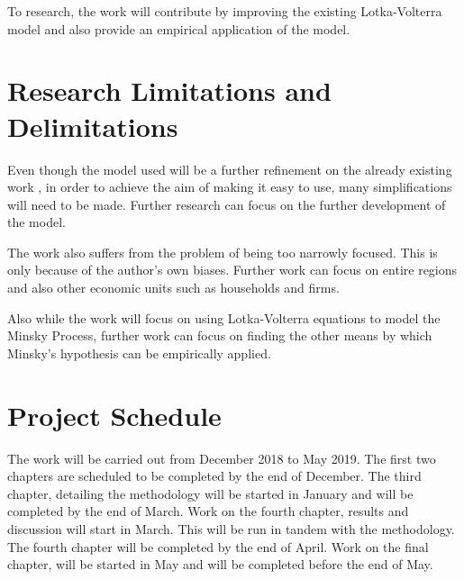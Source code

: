 \documentclass[a4paper]{article}
\begin{document}
	To research, the work will contribute by improving the existing Lotka-Volterra model and also provide an empirical application of the model.
	
	\section{Research Limitations and Delimitations}
	Even though the model used will be a further refinement on the already existing work \cite{vadasz2007economic,vercelli2009perspective,vercelli2010minsky}, in order to achieve the aim of making it easy to use, many simplifications will need to be made. Further research can focus on the further development of the model.
	
	The work also suffers from the problem of being too narrowly focused. This is only because of the author's own biases. Further work can focus on entire regions and also other economic units such as households and firms.
	
	Also while the work will focus on using Lotka-Volterra equations to model the Minsky Process, further work can focus on finding the other means by which Minsky's hypothesis can be empirically applied.
	\section{Project Schedule}
	The work will be carried out from December 2018 to May 2019. The first two chapters are scheduled to be completed by the end of December. The third chapter, detailing the methodology will be started in January and will be completed by the end of March. Work on the fourth chapter, results and discussion will start in March. This will be run in tandem with the methodology. The fourth chapter will be completed by the end of April. Work on the final chapter, will be started in May and will be completed before the end of May.
	
	
\end{document}
